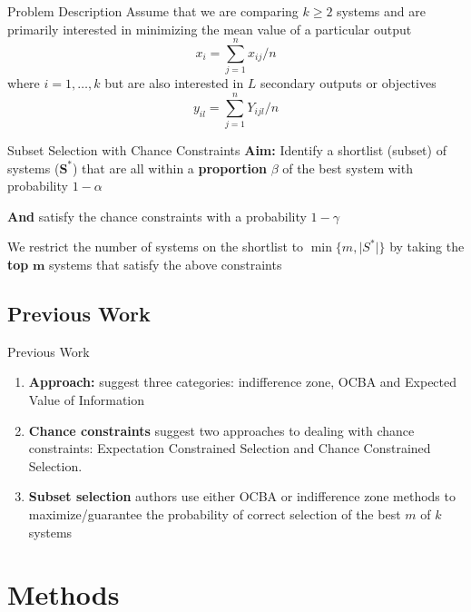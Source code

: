 \documentclass[aspectratio=169]{beamer}
\begin{document}
\begin{frame}{Problem Description}
Assume that we are comparing $k\geq 2$ systems and are primarily interested in minimizing the mean value of a particular output
\[
x_{i} = \sum_{j=1}^{n}x_{ij}/n
\]
where $i=1, \ldots, k$ but are also interested in $L$ secondary outputs or objectives
\[
y_{il} = \sum_{j=1}^{n}Y_{ijl}/n
\]
\end{frame}
\begin{frame}{Subset Selection with Chance Constraints}
    \textbf{Aim:} Identify a shortlist (subset) of systems ($\mathbf{S}^{*}$) that are all within a \textbf{proportion} $\beta$ of the best system with probability $1-\alpha$
    
    \textbf{And} satisfy the chance constraints with a probability $1-\gamma$
    \vspace{1cm}
    
    We restrict the number of systems on the shortlist to $\min \{m,\vert S^{*} \vert \}$ by taking the \textbf{top} $\mathbf{m}$ systems that satisfy the above constraints 
\end{frame}

\subsection{Previous Work}
\begin{frame}{Previous Work}
\begin{enumerate}
    \item \textbf{Approach:} \cite{Branke:MS2007} suggest three categories: indifference zone, OCBA and Expected Value of Information
    \item \textbf{Chance constraints} \cite{Hong:IJOC2015} suggest two approaches to dealing with chance constraints: Expectation Constrained Selection and Chance Constrained Selection. 
    \item \textbf{Subset selection} authors use either OCBA or indifference zone methods to maximize/guarantee the probability of correct selection of the best $m$ of $k$ systems
\end{enumerate}
\end{frame}
\section{Methods}
\end{document}
